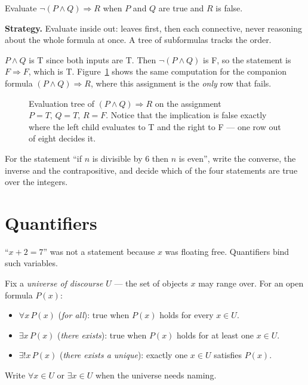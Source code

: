 \begin{example}\label{ex:ttree}
Evaluate $\lnot (P \land Q) \Rightarrow R$ when $P$ and $Q$ are true and $R$ is false.
\par\smallskip
\textbf{Strategy.} Evaluate inside out: leaves first, then each connective, never
reasoning about the whole formula at once. A tree of subformulas tracks the order.
\par\smallskip
\begin{solution}
$P \land Q$ is T since both inputs are T. Then $\lnot(P\land Q)$ is F, so the
statement is $F \Rightarrow F$, which is T. Figure~\ref{fig:tt-tree} shows the same
computation for the companion formula $(P\land Q) \Rightarrow R$, where this
assignment is the \emph{only} row that fails.
\end{solution}
\end{example}

\begin{figure}[ht]\centering

\caption{Evaluation tree of $(P\land Q)\Rightarrow R$ on the assignment
$P{=}T,\,Q{=}T,\,R{=}F$. Notice that the implication is false exactly where the left
child evaluates to T and the right to F --- one row out of eight decides it.}
\label{fig:tt-tree}
\end{figure}

\begin{exercise}[medium]\label{exr:converse}
For the statement ``if $n$ is divisible by $6$ then $n$ is even'', write the
converse, the inverse and the contrapositive, and decide which of the four
statements are true over the integers.
\end{exercise}

\section{Quantifiers}\label{sec:quantifiers}

``$x+2=7$'' was not a statement because $x$ was floating free. Quantifiers bind such
variables.

\begin{definition}%
Fix a \emph{universe of discourse} $U$ --- the set of objects $x$ may range over. For
an open formula $P(x)$:
\begin{itemize}
\item $\forall x\, P(x)$ (\emph{for all}): true when $P(x)$ holds for every $x\in U$.
\item $\exists x\, P(x)$ (\emph{there exists}): true when $P(x)$ holds for at least
one $x\in U$.
\item $\exists! x\, P(x)$ (\emph{there exists a unique}): exactly one $x\in U$
satisfies $P(x)$.
\end{itemize}
Write $\forall x\in U$ or $\exists x\in U$ when the universe needs naming.
\end{definition}

